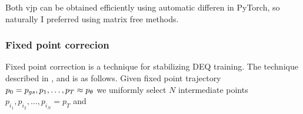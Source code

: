 \documentclass[a4paper,10pt]{report}
\begin{document}
Both vjp can be obtained efficiently using automatic differen in PyTorch, so naturally I preferred using matrix free methods.

\subsubsection{Fixed point correcion}\label{sec:fpc}
Fixed point correction is a technique for stabilizing DEQ training. The technique described in \cite{opticalflow}, \cite{geng2023torchdeq}
and \cite{burger2025dequify} is as follows. Given fixed point trajectory $p_0= p_{gs}, p_1,\ldots, p_T\approx  p_\theta $ we uniformly select $N$ intermediate points $p_{i_1}, p_{i_2}, \ldots , p_{i_N}=p_T$ and
\end{document}
